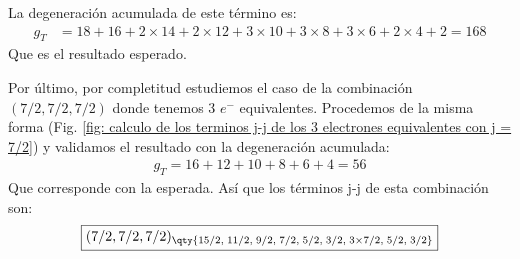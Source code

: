   \hline
  La degeneración acumulada de este término es: 
\begin{align*}
  g_{T} &= 18 + 16 + 2\times 14 + 2\times 12 + 3\times 10 + 3\times 8 + 3\times 6 + 2\times 4 + 2 = 168\end{align*}    
Que es el resultado esperado.\par 
Por último, por completitud estudiemos el caso de la combinación $(7/2, 7/2, 7/2)$ donde tenemos 3 $e^{-}$ equivalentes. Procedemos de la misma forma (Fig. \ref{fig: calculo de los terminos j-j de los 3 electrones equivalentes con j = 7/2}) y validamos el resultado con la degeneración acumulada: 
    \begin{align*}
    g_{T} = 16 + 12 + 10 + 8 + 6 + 4 = 56
    \end{align*}
 Que corresponde con la esperada. Así que los términos j-j de esta combinación son: 
 \begin{align*}
   \boxed{
   (7/2, 7/2, 7/2)_\qty{15/2,\; 11/2,\;  9/2,\;  7/2,\;  5/2, \; 3/2,\;  3 \times 7/2,\; 5/2,\;  3/2}}
 \end{align*}
